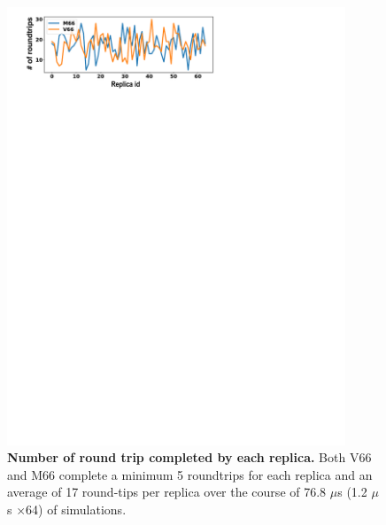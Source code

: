 \documentclass[10pt,letterpaper]{article}
\begin{document}
\begin{figure}[!ht]
\includegraphics[scale=0.5,width=0.9\textwidth,trim={0 0cm 0 0cm},clip]{../figures/S7.pdf}
\caption{{\bf Number of round trip completed by each replica.} Both V66 and M66 complete a minimum 5 roundtrips for each replica and an average of 17 round-tips per replica over the course of 76.8 $\mu$s (1.2 $\mu$s $\times$64) of simulations.}
\label{S7} 
\end{figure}

\clearpage


\end{document}
